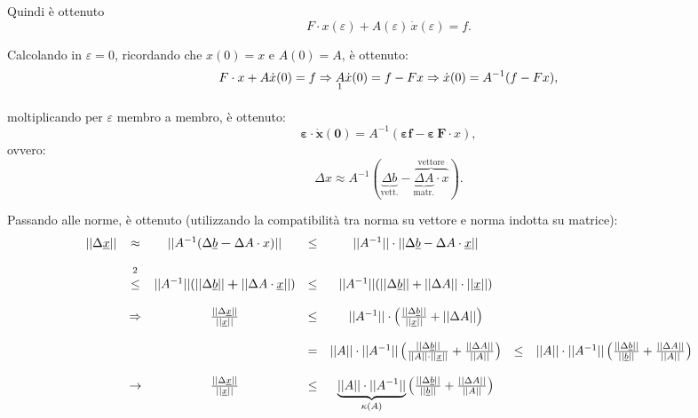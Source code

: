 Quindi è ottenuto
\begin{equation*}
 F\cdot x(\varepsilon) + A(\varepsilon)\,\dot x(\varepsilon)=f.
\end{equation*}


Calcolando in $\varepsilon=0$, ricordando che $x(0)=x$ e $A(0)=A$, è ottenuto: 
\begin{equation*}
    F\cdot x + A \dot x(0) = f \Rightarrow \underset{\footnotemark}{A} \dot x(0) = f - Fx\Rightarrow \dot x(0) = A^{-1}(f - Fx),
\end{equation*}

moltiplicando per $\varepsilon$ membro a membro, è ottenuto:
\begin{equation}
    \boldsymbol{\varepsilon\cdot\dot x(0)} = A^{-1}(\boldsymbol{\varepsilon f} - \boldsymbol{\varepsilon\,F}\cdot x),
\end{equation}
ovvero:
\begin{equation*}
    \Delta x\approx A^{-1}(\underbrace{\Delta b}_{\text{vett.}}- \overbrace{\underbrace{\Delta A}_{\text{matr.}}\cdot x}^{\text{vettore}}).
\end{equation*}

Passando alle norme, è ottenuto (utilizzando la compatibilità tra norma su vettore e norma indotta su matrice):
\begin{equation}\label{eq:condizionamento_sistema_lineare}
    \begin{matrix}
        ||\Delta \uline x|| &\approx& ||A^{-1}(\Delta\uline b \boldsymbol- \Delta A\cdot x)|| &\leq& ||A^{-1}||\cdot ||\Delta\uline b - \Delta A\cdot \uline x||\\\\
        &\overset{\footnotemark}{\leq}& ||A^{-1}|| (||\Delta\uline b||\boldsymbol + ||\Delta A\cdot \uline x||) &\leq& ||A^{-1}|| (||\Delta\uline b|| + ||\Delta A||\cdot ||\uline x||)\\\\
        &\Rightarrow& \frac{||\Delta \uline x||}{||\uline x||}&\leq& ||A^{-1}|| \cdot\left(\frac{||\Delta\uline b||}{||\uline x||} + ||\Delta A||\right)\\\\
        & & &=& ||A||\cdot||A^{-1}||\left(\frac{||\Delta\uline b||}{||A||\cdot ||\uline x||} + \frac{||\Delta A||}{||A||}\right) &\leq& ||A||\cdot||A^{-1}||\left(\frac{||\Delta\uline b||}{||\uline b||} + \frac{||\Delta A||}{||A||}\right)\\\\
        &\rightarrow& \frac{||\Delta\uline x||}{||\uline x||} &\leq& \underbrace{||A||\cdot||A^{-1}||}_{\kappa(A)}\left(\frac{||\Delta\uline b||}{||\uline b||} + \frac{||\Delta A||}{||A||}\right)
    \end{matrix}
\end{equation}

